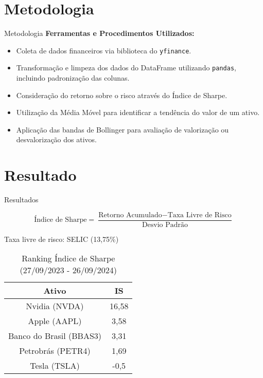 \documentclass[aspectratio=169]{beamer}
\begin{document}
\section{Metodologia}
\begin{frame}{Metodologia}
  \textbf{Ferramentas e Procedimentos Utilizados:}
  \begin{itemize}
    \item Coleta de dados financeiros via biblioteca do \texttt{yfinance}.
    \item Transformação e limpeza dos dados do DataFrame utilizando \texttt{pandas}, incluindo padronização das colunas.
    \item Consideração do retorno sobre o risco através do Índice de Sharpe.
    \item Utilização da Média Móvel para identificar a tendência do valor de um ativo.
    \item Aplicação das bandas de Bollinger para avaliação de valorização ou desvalorização dos ativos.
  \end{itemize}
\end{frame}

\section{Resultado}

\begin{frame}{Resultados}

\begin{center}
\[
\text{Índice de Sharpe} = \frac{\text{Retorno Acumulado} - \text{Taxa Livre de Risco}}{\text{Desvio Padrão}}
\]
\end{center}

\vspace{0.5em}

\begin{center}
Taxa livre de risco: SELIC (13,75\%)
\end{center}


\begin{table}[h]
    \centering
    \large
    \begin{tabular}{|c|c|} %
        \hline %
        Ativo  & IS \\ %
        \hline %
        Nvidia (NVDA)   & 16,58   \\ %
        \hline %
        Apple (AAPL)   & 3,58   \\ %
        \hline %
        Banco do Brasil (BBAS3)  & 3,31   \\ %
        \hline %
        Petrobrás (PETR4)  & 1,69   \\ %
        \hline %
        Tesla (TSLA)   & -0,5  \\ %
        \hline %
    \end{tabular}
    \caption{Ranking Índice de Sharpe (27/09/2023 - 26/09/2024)}
    \label{tab:ranking_sharpe}
\end{table}
\end{frame}
\end{document}

